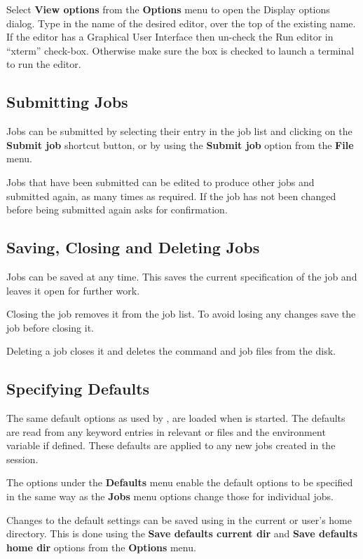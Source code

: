 Select \textbf{View options} from the \textbf{Options} menu to open the Display options dialog. Type in the name of the desired editor, over
the top of the existing name. If the editor has a Graphical User Interface then un-check the Run editor in
``xterm'' check-box. Otherwise make sure the box is checked to launch a terminal to run the editor.

\subsection{Submitting Jobs}
Jobs can be submitted by selecting their entry in the job list and clicking on the \textbf{Submit job} shortcut button, or by using the
\textbf{Submit job} option from the \textbf{File} menu.

Jobs that have been submitted can be edited to produce other jobs and submitted again, as many times as required. If the job has not been
changed before being submitted again \PrXmbtr{} asks for confirmation.

\subsection{Saving, Closing and Deleting Jobs}
Jobs can be saved at any time. This saves the current specification of the job and leaves it open for further work.

Closing the job removes it from the job list. To avoid losing any changes save the job before closing it.

Deleting a job closes it and deletes the command and job files from the disk.

\subsection{Specifying Defaults}
The same default options as used by \PrBtr{}, are loaded when \PrXmbtr{} is started. The defaults are
read from any \filename{\BtrVarname} keyword entries in relevant \configurationfile{} or \homeconfigpath{} files and the \filename{\BtrVarname}
environment variable if defined. These defaults are applied to any new jobs created in the \PrXmbtr{} session.

The options under the \textbf{Defaults} menu enable the default options to be specified in the same way as the \textbf{Jobs} menu options
change those for individual jobs.

Changes to the default settings can be saved using in the current or user's home directory. This is done using the \textbf{Save defaults current dir} and \textbf{Save defaults home dir} options from the \textbf{Options} menu.


